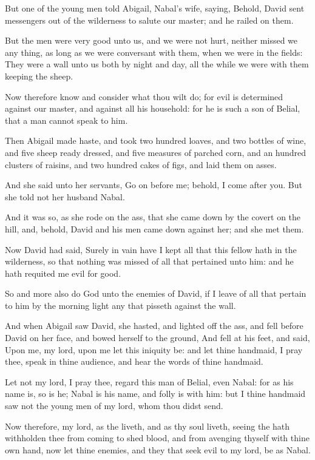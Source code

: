 \verse But one of the young men told Abigail, Nabal's wife, saying, Behold, David sent messengers out of the wilderness to salute our master; and he railed on them.

\verse But the men were very good unto us, and we were not hurt, neither missed we any thing, as long as we were conversant with them, when we were in the fields: \verse They were a wall unto us both by night and day, all the while we were with them keeping the sheep.

\verse Now therefore know and consider what thou wilt do; for evil is determined against our master, and against all his household: for he is such a son of Belial, that a man cannot speak to him.

\verse Then Abigail made haste, and took two hundred loaves, and two bottles of wine, and five sheep ready dressed, and five measures of parched corn, and an hundred clusters of raisins, and two hundred cakes of figs, and laid them on asses.

\verse And she said unto her servants, Go on before me; behold, I come after you. But she told not her husband Nabal.

\verse And it was so, as she rode on the ass, that she came down by the covert on the hill, and, behold, David and his men came down against her; and she met them.

\verse Now David had said, Surely in vain have I kept all that this fellow hath in the wilderness, so that nothing was missed of all that pertained unto him: and he hath requited me evil for good.

\verse So and more also do God unto the enemies of David, if I leave of all that pertain to him by the morning light any that pisseth against the wall.

\verse And when Abigail saw David, she hasted, and lighted off the ass, and fell before David on her face, and bowed herself to the ground, \verse And fell at his feet, and said, Upon me, my lord, upon me let this iniquity be: and let thine handmaid, I pray thee, speak in thine audience, and hear the words of thine handmaid.

\verse Let not my lord, I pray thee, regard this man of Belial, even Nabal: for as his name is, so is he; Nabal is his name, and folly is with him: but I thine handmaid saw not the young men of my lord, whom thou didst send.

\verse Now therefore, my lord, as the \LORD liveth, and as thy soul liveth, seeing the \LORD hath withholden thee from coming to shed blood, and from avenging thyself with thine own hand, now let thine enemies, and they that seek evil to my lord, be as Nabal.

